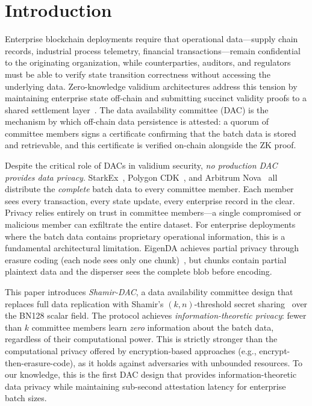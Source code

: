 
\section{Introduction}

Enterprise blockchain deployments require that operational data---supply chain
records, industrial process telemetry, financial transactions---remain
confidential to the originating organization, while counterparties, auditors,
and regulators must be able to verify state transition correctness without
accessing the underlying data. Zero-knowledge validium architectures address
this tension by maintaining enterprise state off-chain and submitting succinct
validity proofs to a shared settlement layer~\cite{ethereum2024validium}. The
data availability committee (DAC) is the mechanism by which off-chain data
persistence is attested: a quorum of committee members signs a certificate
confirming that the batch data is stored and retrievable, and this certificate
is verified on-chain alongside the ZK proof.

Despite the critical role of DACs in validium security, \emph{no production
DAC provides data privacy}. StarkEx~\cite{starkware2024da}, Polygon
CDK~\cite{polygon2024cdk}, and Arbitrum Nova~\cite{arbitrum2024anytrust} all
distribute the \emph{complete} batch data to every committee member. Each
member sees every transaction, every state update, every enterprise record in
the clear. Privacy relies entirely on trust in committee members---a single
compromised or malicious member can exfiltrate the entire dataset. For
enterprise deployments where the batch data contains proprietary operational
information, this is a fundamental architectural limitation. EigenDA achieves
partial privacy through erasure coding (each node sees only one
chunk)~\cite{eigenlayer2025v2}, but chunks contain partial plaintext data and
the disperser sees the complete blob before encoding.

This paper introduces \emph{Shamir-DAC}, a data availability committee design
that replaces full data replication with Shamir's $(k,n)$-threshold secret
sharing~\cite{shamir1979share} over the BN128 scalar field. The protocol
achieves \emph{information-theoretic privacy}: fewer than $k$ committee
members learn \emph{zero} information about the batch data, regardless of
their computational power. This is strictly stronger than the computational
privacy offered by encryption-based approaches (e.g., encrypt-then-erasure-code),
as it holds against adversaries with unbounded resources. To our knowledge,
this is the first DAC design that provides information-theoretic data privacy
while maintaining sub-second attestation latency for enterprise batch sizes.

